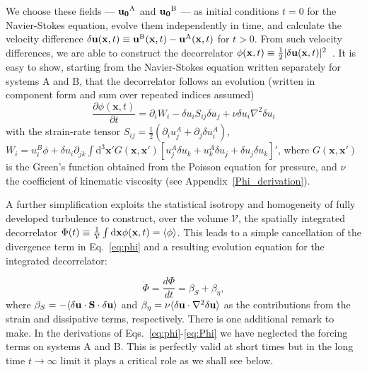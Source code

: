 \documentclass[amsmath,amssymb,amsbsy,pre,twocolumn,tightenlines,superscriptaddress,floatfix]{revtex4-2}
\begin{document}
We choose these fields ---  ${\bf u_0}^{\rm A}$ and  ${\bf u_0}^{\rm B}$ --- as
initial conditions $t = 0$ for the Navier-Stokes equation, evolve them independently in time, and
calculate the velocity difference $\delta {\bf u} ({\bf x},t) \equiv  {\bf
u}^{\rm B}({\bf x},t) - {\bf u}^{\rm A}({\bf x},t)$ for $t > 0$. From such
velocity differences, we are able to construct the decorrelator $\phi({\bf
x},t) \equiv \frac{1}{2} |\delta {\bf u} ({\bf x},t)|^2 $~\cite{GTEuler,mukherjee2023intermittency}.
It is easy to show, starting from the Navier-Stokes equation written separately for systems A and
B, that the decorrelator follows an evolution (written in component form and
sum over repeated indices assumed)
\begin{equation}
	\frac{\partial \phi(\mathbf{x},t)}{\partial t} = \partial_i W_i - \delta u_i S_{ij} \delta u_j +
	\nu \delta u_i \nabla^2\delta u_i
	\label{eq:phi}
\end{equation}
with the strain-rate tensor
$S_{ij} = \frac{1}{2}(\partial_i u^A_j + \partial_j \delta u^A_i)$,
$W_i = u^B_i \phi + \delta u_i \partial_{jk}\int \mathrm{d}^3 \mathbf{x'}
G(\mathbf{x},\mathbf{x'})[u^A_j\delta u_k + u^A_k \delta u_j + \delta u_j \delta u_k]'$,
where $G(\mathbf{x}, \mathbf{x'})$ is the Green's function obtained from the Poisson equation for pressure, and $\nu$ the coefficient of
kinematic viscosity (see Appendix~\ref{Phi_derivation}).

A further simplification exploits the statistical isotropy and
homogeneity of fully developed turbulence to construct, over the volume
$\mathcal{V}$, the spatially integrated decorrelator $\Phi (t) \equiv
\frac{1}{\mathcal{V}}\int \mathrm{d}{\bf x} \phi ({\bf x},t) = \langle \phi
\rangle$. This leads to a simple cancellation of the divergence term in
Eq.~\eqref{eq:phi} and a resulting evolution equation for the integrated decorrelator:

\begin{equation}
	\dot{\Phi} = \frac{d\Phi}{dt} = \beta_S + \beta_\eta,
	 \label{eq:Phi}
\end{equation}
where $\beta_S = -\langle \delta {\bf u}\cdot \mathbf{S} \cdot \delta {\bf u}\rangle$ and $\beta_\eta = \nu \langle \delta {\bf u} \cdot \nabla^2 \delta {\bf u}\rangle$ as
the contributions from the strain and dissipative terms, respectively.
There is one additional remark to make.  In the derivations of Eqs.~\eqref{eq:phi}-\eqref{eq:Phi} we have neglected
the forcing terms on systems A and B. This is perfectly valid at short times but in the long time $t \to \infty$ limit
it plays a critical role as we shall see below.
\end{document}
